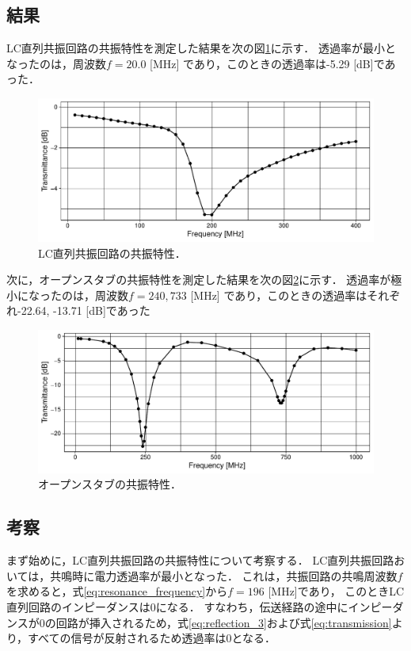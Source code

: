 \documentclass[uplatex,dvipdfmx,a4j,12pt]{jsarticle}
\begin{document}
\subsection{結果}
LC直列共振回路の共振特性を測定した結果を次の図\ref{fig:3-1}に示す．
透過率が最小となったのは，周波数$f = 20.0$ [MHz] であり，このときの透過率は-5.29 [dB]であった．
\begin{figure}[H]
    \centering
    \includegraphics[width=\linewidth]{data/3_1/transmittance.pdf}
    \caption{LC直列共振回路の共振特性．}
    \label{fig:3-1}
\end{figure}

次に，オープンスタブの共振特性を測定した結果を次の図\ref{fig:3-2}に示す．
透過率が極小になったのは，周波数$f = 240, 733$ [MHz] であり，このときの透過率はそれぞれ-22.64, -13.71 [dB]であった
\begin{figure}[H]
    \centering
    \includegraphics[width=\linewidth]{data/3_2/transmittance.pdf}
    \caption{オープンスタブの共振特性．}
    \label{fig:3-2}
\end{figure}


\subsection{考察}
まず始めに，LC直列共振回路の共振特性について考察する．
LC直列共振回路おいては，共鳴時に電力透過率が最小となった．
これは，共振回路の共鳴周波数$f$を求めると，式\eqref{eq:resonance_frequency}から$f = 196$ [MHz]であり，
このときLC直列回路のインピーダンスは0になる．
すなわち，伝送経路の途中にインピーダンスが0の回路が挿入されるため，式\eqref{eq:reflection_3}および式\eqref{eq:transmission}より，すべての信号が反射されるため透過率は0となる．
\end{document}
